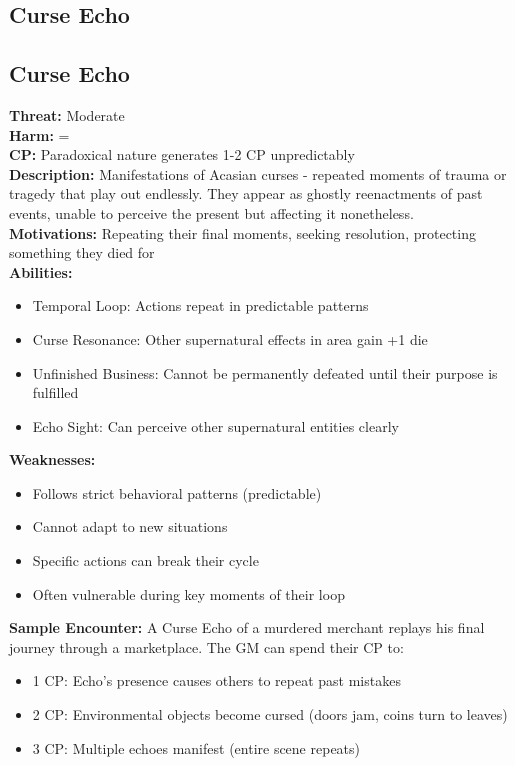 \documentclass[11pt]{article}
\newenvironment{monsterentry}[1]{%
  \begin{mdframed}[backgroundcolor=shadecolor, linewidth=0pt, leftmargin=0pt, rightmargin=0pt]%
  \subsection*{#1}%
}{%
  \end{mdframed}%
}
\begin{document}
\subsection{Curse Echo}

\begin{monsterentry}{Curse Echo}
\textbf{Threat:} Moderate \\
\textbf{Harm:} = \\
\textbf{CP:} Paradoxical nature generates 1-2 CP unpredictably \\
\textbf{Description:} Manifestations of Acasian curses - repeated moments of trauma or tragedy that play out endlessly. They appear as ghostly reenactments of past events, unable to perceive the present but affecting it nonetheless. \\
\textbf{Motivations:} Repeating their final moments, seeking resolution, protecting something they died for \\
\textbf{Abilities:}
\begin{itemize}
    \item Temporal Loop: Actions repeat in predictable patterns
    \item Curse Resonance: Other supernatural effects in area gain +1 die
    \item Unfinished Business: Cannot be permanently defeated until their purpose is fulfilled
    \item Echo Sight: Can perceive other supernatural entities clearly
\end{itemize}
\textbf{Weaknesses:}
\begin{itemize}
    \item Follows strict behavioral patterns (predictable)
    \item Cannot adapt to new situations
    \item Specific actions can break their cycle
    \item Often vulnerable during key moments of their loop
\end{itemize}
\textbf{Sample Encounter:} A Curse Echo of a murdered merchant replays his final journey through a marketplace. The GM can spend their CP to:
\begin{itemize}
    \item 1 CP: Echo's presence causes others to repeat past mistakes
    \item 2 CP: Environmental objects become cursed (doors jam, coins turn to leaves)
    \item 3 CP: Multiple echoes manifest (entire scene repeats)
\end{itemize}
\end{monsterentry}
\end{document}
